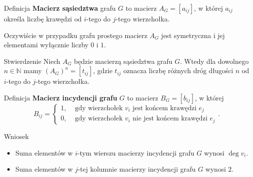 \documentclass[a4paper,10pt]{beamer}
\begin{document}
\begin{frame}
	
	\begin{block}{Definicja}
		{\bf Macierz sąsiedztwa} grafu $G$ to macierz $A_G=[a_{ij}]$, w której $a_{ij}$ określa liczbę krawędzi od $i$-tego do $j$-tego wierzchołka.  
	\end{block}
	Oczywiście w przypadku grafu prostego macierz $A_G$ jest symetryczna i jej elementami wyłącznie liczby $0$ i $1$.
	
	\begin{block}{Stwierdzenie}
		Niech $A_G$ będzie macierzą sąsiedztwa grafu $G$. Wtedy dla dowolnego $n\in\mathbb{N}$ mamy $(A_G)^n=[t_{ij}]$, gdzie $t_{ij}$ oznacza liczbę różnych dróg długości $n$ od $i$-tego do $j$-tego wierzchołka.
	\end{block}
	
\end{frame}



\begin{frame}
	
	\begin{block}{Definicja}
		{\bf Macierz incydencji grafu} $G$ to macierz $B_G=[b_{ij}]$, w której
		$$B_{ij}=\left\{\begin{array}{ll}1,&\mbox{ gdy wierzchołek }v_i\mbox{ jest końcem krawędzi }e_j\\0,&\mbox{ gdy wierzchołek }v_i\mbox{ nie jest końcem krawędzi }e_j\end{array}\right..$$
	\end{block}
	
	\begin{block}{Wniosek}
	\begin{itemize}
	\item Suma elementów w $i$-tym wierszu macierzy incydencji grafu $G$ wynosi $\deg v_i$.
	\item Suma elementów w $j$-tej kolumnie macierzy incydencji grafu $G$ wynosi $2$.
	\end{itemize}
	\end{block}

\end{frame}
\end{document}
